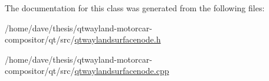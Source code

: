 The documentation for this class was generated from the following files\-:\begin{DoxyCompactItemize}
\item 
/home/dave/thesis/qtwayland-\/motorcar-\/compositor/qt/src/\hyperlink{qtwaylandsurfacenode_8h}{qtwaylandsurfacenode.\-h}\item 
/home/dave/thesis/qtwayland-\/motorcar-\/compositor/qt/src/\hyperlink{qtwaylandsurfacenode_8cpp}{qtwaylandsurfacenode.\-cpp}\end{DoxyCompactItemize}
